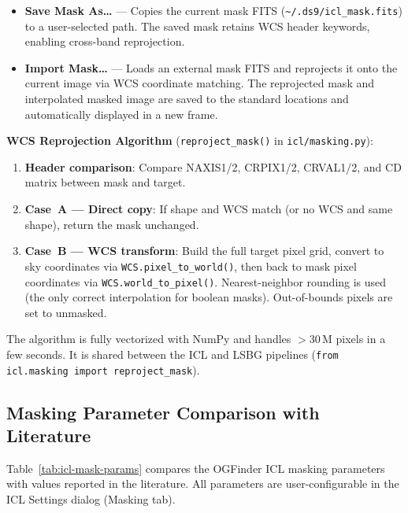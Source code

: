 \documentclass[11pt,fleqn]{book}
\begin{document}
\begin{itemize}[leftmargin=2em]
  \item \textbf{Save Mask As\ldots} --- Copies the current mask FITS (\texttt{\textasciitilde/.ds9/icl\_mask.fits}) to a user-selected path.  The saved mask retains WCS header keywords, enabling cross-band reprojection.
  \item \textbf{Import Mask\ldots} --- Loads an external mask FITS and reprojects it onto the current image via WCS coordinate matching.  The reprojected mask and interpolated masked image are saved to the standard locations and automatically displayed in a new frame.
\end{itemize}

\noindent\textbf{WCS Reprojection Algorithm} (\texttt{reproject\_mask()} in \texttt{icl/masking.py}):

\begin{enumerate}[leftmargin=2em]
  \item \textbf{Header comparison}: Compare NAXIS1/2, CRPIX1/2, CRVAL1/2, and CD matrix between mask and target.
  \item \textbf{Case~A --- Direct copy}: If shape and WCS match (or no WCS and same shape), return the mask unchanged.
  \item \textbf{Case~B --- WCS transform}: Build the full target pixel grid, convert to sky coordinates via \texttt{WCS.pixel\_to\_world()}, then back to mask pixel coordinates via \texttt{WCS.world\_to\_pixel()}.  Nearest-neighbor rounding is used (the only correct interpolation for boolean masks).  Out-of-bounds pixels are set to unmasked.
\end{enumerate}

\noindent The algorithm is fully vectorized with NumPy and handles $>30$\,M pixels in a few seconds.  It is shared between the ICL and LSBG pipelines (\texttt{from icl.masking import reproject\_mask}).

\subsection{Masking Parameter Comparison with Literature}

Table~\ref{tab:icl-mask-params} compares the OGFinder ICL masking parameters with values reported in the literature.  All parameters are user-configurable in the ICL Settings dialog (Masking tab).
\end{document}
